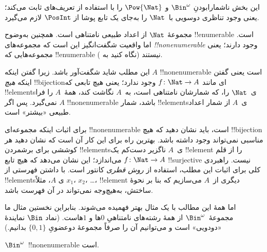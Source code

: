 \documentclass[../../../include/open-logic-section]{subfiles}
\begin{document}


\begin{editorial}
  این بخش ناشمارابودنِ $\Bin^\omega$ و $\Pow{\Nat}$ را با استفاده از
  تعریف‌های  ثابت می‌کند؛ یعنی وجود تناظری دوسویی
  با~$\Nat$ را به‌جای یک تابع پوشا از $\PosInt$ لازم می‌گیرد.
\end{editorial}

\begin{explain}
مجموعهٔ $\Nat$ از اعداد طبیعی نامتناهی است. همچنین به‌وضوح
!!{enumerable} است. اما واقعیت شگفت‌انگیز این است که مجموعه‌های
\emph{!!{nonenumerable}} وجود دارند؛ یعنی مجموعه‌هایی که !!{enumerable}
نیستند (نگاه کنید به ).

این مطلب شاید شگفت‌آور باشد. زیرا گفتن اینکه $A$
!!{nonenumerable} است یعنی گفتن اینکه \emph{هیچ} !!{bijection}‌ای مانند $f
\colon \Nat \to A$ وجود ندارد؛ یعنی هیچ تابعی که !!{element}sی~$\Nat$
را، که شمارشان نامتناهی است، به~$A$ نگاشت کند، همهٔ~$A$ را فرا نمی‌گیرد. پس اگر
$A$ !!{nonenumerable} باشد، شمار !!{element}sی~$A$ از شمار اعداد طبیعی
«بیشتر» است.

برای اثبات اینکه مجموعه‌ای !!{nonenumerable} است، باید نشان دهید که هیچ
!!{bijection} مناسبی نمی‌تواند وجود داشته باشد. بهترین راه برای این کار
آن است که نشان دهید هر کوششی برای برشمردن !!{element}sی~$A$ ناگزیر
دست‌کم یک !!{element} را از قلم می‌اندازد؛ این نشان می‌دهد که هیچ تابع
$f\colon \Nat \to A$ !!{surjective} نیست. راهبردی کلی برای اثبات این
مطلب، استفاده از \emph{روش قطری} کانتور است. با داشتن فهرستی از
!!{element}sی $A$، مثلاً $x_1$، $x_2$، \dots، !!{element} دیگری از~$A$
می‌سازیم که بنا بر نحوهٔ ساختش، به‌هیچ‌وجه نمی‌تواند در آن فهرست باشد.

اما همهٔ این مطالب با یک مثال بهتر فهمیده می‌شوند. بنابراین نخستین مثال
ما مجموعهٔ~$\Bin^\omega$ از همهٔ رشته‌های نامتناهیِ $0$ها و $1$هاست.
(نماد $\Bin$ نمایندهٔ «دودویی» است و می‌توانیم آن را صرفاً مجموعهٔ دوعضویِ
$\{0,1\}$ بدانیم.)
\end{explain}

\begin{thm}
$\Bin^\omega$~!!{nonenumerable} است.
\end{thm}
\end{document}
